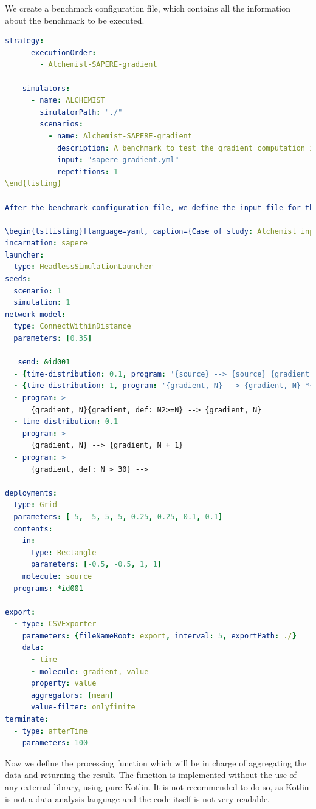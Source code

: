 \documentclass[12pt,a4paper,openright,twoside]{book}
\begin{document}
We create a benchmark configuration file, which contains all the information about the benchmark to be executed.

\begin{lstlisting}[language=yaml, caption={Case of study: benchmark configuration file}]
    strategy:
      executionOrder:
        - Alchemist-SAPERE-gradient
    
    simulators:
      - name: ALCHEMIST
        simulatorPath: "./"
        scenarios:
          - name: Alchemist-SAPERE-gradient
            description: A benchmark to test the gradient computation in the Sapere incarnation.
            input: "sapere-gradient.yml"
            repetitions: 1
\end{listing}

After the benchmark configuration file, we define the input file for the Alchemist simulation:

\begin{lstlisting}[language=yaml, caption={Case of study: Alchemist input file}]
incarnation: sapere
launcher:
  type: HeadlessSimulationLauncher
seeds:
  scenario: 1
  simulation: 1
network-model:
  type: ConnectWithinDistance
  parameters: [0.35]

  _send: &id001
  - {time-distribution: 0.1, program: '{source} --> {source} {gradient, 0}'}
  - {time-distribution: 1, program: '{gradient, N} --> {gradient, N} *{gradient, N+#D}'}
  - program: >
      {gradient, N}{gradient, def: N2>=N} --> {gradient, N}
  - time-distribution: 0.1
    program: >
      {gradient, N} --> {gradient, N + 1}
  - program: >
      {gradient, def: N > 30} -->

deployments:
  type: Grid
  parameters: [-5, -5, 5, 5, 0.25, 0.25, 0.1, 0.1]
  contents:
    in:
      type: Rectangle
      parameters: [-0.5, -0.5, 1, 1]
    molecule: source
  programs: *id001
  
export:
  - type: CSVExporter
    parameters: {fileNameRoot: export, interval: 5, exportPath: ./}
    data: 
      - time
      - molecule: gradient, value
      property: value
      aggregators: [mean]
      value-filter: onlyfinite
terminate:
  - type: afterTime
    parameters: 100
\end{lstlisting}

Now we define the processing function which will be in charge of aggregating the data and returning the result.
The function is implemented without the use of any external library, using pure Kotlin.
It is not recommended to do so, as Kotlin is not a data analysis language and the code itself is not very readable.
\end{document}
